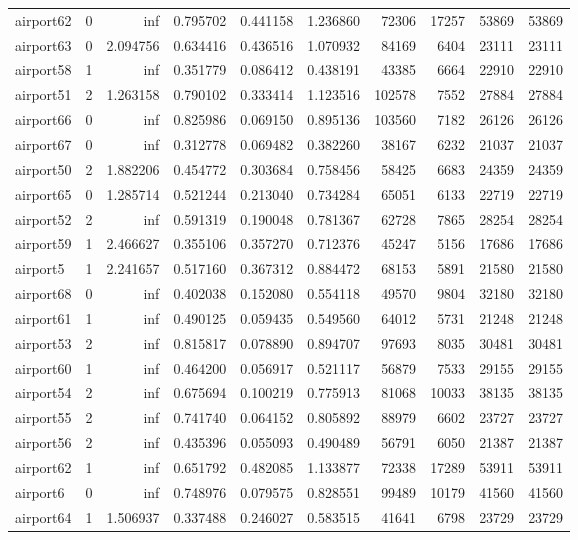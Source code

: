\begin{longtable}{|l|r|r|r|r|r|r|r|r|r|}
airport62 & 0 & inf & 0.795702 & 0.441158 & 1.236860 & 72306 & 17257 & 53869 & 53869 \\
airport63 & 0 & 2.094756 & 0.634416 & 0.436516 & 1.070932 & 84169 & 6404 & 23111 & 23111 \\
airport58 & 1 & inf & 0.351779 & 0.086412 & 0.438191 & 43385 & 6664 & 22910 & 22910 \\
airport51 & 2 & 1.263158 & 0.790102 & 0.333414 & 1.123516 & 102578 & 7552 & 27884 & 27884 \\
airport66 & 0 & inf & 0.825986 & 0.069150 & 0.895136 & 103560 & 7182 & 26126 & 26126 \\
airport67 & 0 & inf & 0.312778 & 0.069482 & 0.382260 & 38167 & 6232 & 21037 & 21037 \\
airport50 & 2 & 1.882206 & 0.454772 & 0.303684 & 0.758456 & 58425 & 6683 & 24359 & 24359 \\
airport65 & 0 & 1.285714 & 0.521244 & 0.213040 & 0.734284 & 65051 & 6133 & 22719 & 22719 \\
airport52 & 2 & inf & 0.591319 & 0.190048 & 0.781367 & 62728 & 7865 & 28254 & 28254 \\
airport59 & 1 & 2.466627 & 0.355106 & 0.357270 & 0.712376 & 45247 & 5156 & 17686 & 17686 \\
airport5 & 1 & 2.241657 & 0.517160 & 0.367312 & 0.884472 & 68153 & 5891 & 21580 & 21580 \\
airport68 & 0 & inf & 0.402038 & 0.152080 & 0.554118 & 49570 & 9804 & 32180 & 32180 \\
airport61 & 1 & inf & 0.490125 & 0.059435 & 0.549560 & 64012 & 5731 & 21248 & 21248 \\
airport53 & 2 & inf & 0.815817 & 0.078890 & 0.894707 & 97693 & 8035 & 30481 & 30481 \\
airport60 & 1 & inf & 0.464200 & 0.056917 & 0.521117 & 56879 & 7533 & 29155 & 29155 \\
airport54 & 2 & inf & 0.675694 & 0.100219 & 0.775913 & 81068 & 10033 & 38135 & 38135 \\
airport55 & 2 & inf & 0.741740 & 0.064152 & 0.805892 & 88979 & 6602 & 23727 & 23727 \\
airport56 & 2 & inf & 0.435396 & 0.055093 & 0.490489 & 56791 & 6050 & 21387 & 21387 \\
airport62 & 1 & inf & 0.651792 & 0.482085 & 1.133877 & 72338 & 17289 & 53911 & 53911 \\
airport6 & 0 & inf & 0.748976 & 0.079575 & 0.828551 & 99489 & 10179 & 41560 & 41560 \\
airport64 & 1 & 1.506937 & 0.337488 & 0.246027 & 0.583515 & 41641 & 6798 & 23729 & 23729 \\

\end{longtable}
